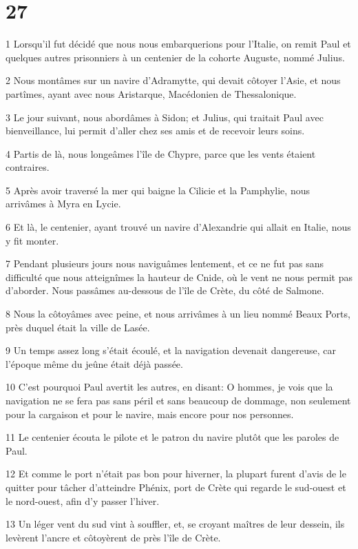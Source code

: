 \chapter{27}

\par 1 Lorsqu'il fut décidé que nous nous embarquerions pour l'Italie, on remit Paul et quelques autres prisonniers à un centenier de la cohorte Auguste, nommé Julius.
\par 2 Nous montâmes sur un navire d'Adramytte, qui devait côtoyer l'Asie, et nous partîmes, ayant avec nous Aristarque, Macédonien de Thessalonique.
\par 3 Le jour suivant, nous abordâmes à Sidon; et Julius, qui traitait Paul avec bienveillance, lui permit d'aller chez ses amis et de recevoir leurs soins.
\par 4 Partis de là, nous longeâmes l'île de Chypre, parce que les vents étaient contraires.
\par 5 Après avoir traversé la mer qui baigne la Cilicie et la Pamphylie, nous arrivâmes à Myra en Lycie.
\par 6 Et là, le centenier, ayant trouvé un navire d'Alexandrie qui allait en Italie, nous y fit monter.
\par 7 Pendant plusieurs jours nous naviguâmes lentement, et ce ne fut pas sans difficulté que nous atteignîmes la hauteur de Cnide, où le vent ne nous permit pas d'aborder. Nous passâmes au-dessous de l'île de Crète, du côté de Salmone.
\par 8 Nous la côtoyâmes avec peine, et nous arrivâmes à un lieu nommé Beaux Ports, près duquel était la ville de Lasée.
\par 9 Un temps assez long s'était écoulé, et la navigation devenait dangereuse, car l'époque même du jeûne était déjà passée.
\par 10 C'est pourquoi Paul avertit les autres, en disant: O hommes, je vois que la navigation ne se fera pas sans péril et sans beaucoup de dommage, non seulement pour la cargaison et pour le navire, mais encore pour nos personnes.
\par 11 Le centenier écouta le pilote et le patron du navire plutôt que les paroles de Paul.
\par 12 Et comme le port n'était pas bon pour hiverner, la plupart furent d'avis de le quitter pour tâcher d'atteindre Phénix, port de Crète qui regarde le sud-ouest et le nord-ouest, afin d'y passer l'hiver.
\par 13 Un léger vent du sud vint à souffler, et, se croyant maîtres de leur dessein, ils levèrent l'ancre et côtoyèrent de près l'île de Crète.
